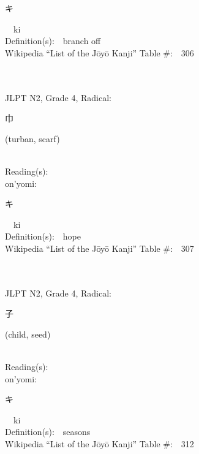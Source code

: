 \begin{multicols}{2}
{\hspace*{2em}}{\begin{CJK}{UTF8}{min} キ \end{CJK}}\ \ ki\ \ \\
Definition(s):\ \ branch off \\
Wikipedia ``List of the J\=oy\=o Kanji'' Table \#:\ \ 306 \\
\ \ \\
{\fontsize{34pt}{40pt}  }\ \ \\  %
{JLPT N2, Grade 4, Radical:\ \ {\begin{CJK}{UTF8}{min} 巾 \end{CJK}} (turban, scarf) } \\
Reading(s):\ \ \\
{\hspace*{1em}}on'yomi:\ \ \\
{\hspace*{2em}}{\begin{CJK}{UTF8}{min} キ \end{CJK}}\ \ ki\ \ \\
Definition(s):\ \ hope \\
Wikipedia ``List of the J\=oy\=o Kanji'' Table \#:\ \ 307 \\
\ \ \\
{\fontsize{34pt}{40pt}  }\ \ \\  %
{JLPT N2, Grade 4, Radical:\ \ {\begin{CJK}{UTF8}{min} 子 \end{CJK}} (child, seed) } \\
Reading(s):\ \ \\
{\hspace*{1em}}on'yomi:\ \ \\
{\hspace*{2em}}{\begin{CJK}{UTF8}{min} キ \end{CJK}}\ \ ki\ \ \\
Definition(s):\ \ seasons \\
Wikipedia ``List of the J\=oy\=o Kanji'' Table \#:\ \ 312 \\
\ \ \\

\end{multicols}
